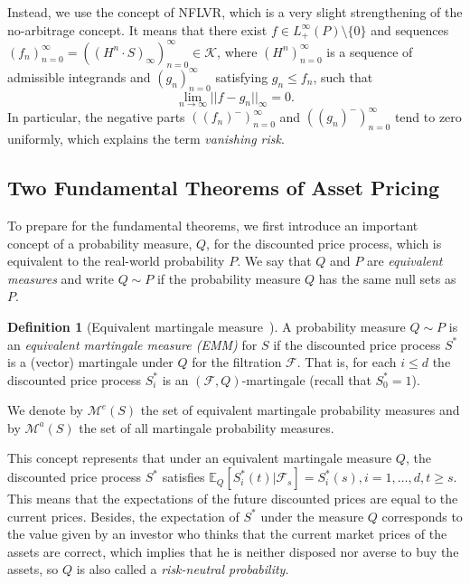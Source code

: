 \documentclass[a4paper]{article}
\theoremstyle{definition}
\newtheorem{definition}[theorem]{Definition}
\numberwithin{equation}{section}
\begin{document}
Instead, we use the concept of NFLVR, which is a very slight strengthening of the no-arbitrage concept. It means that there exist $f\in L^\infty_+(P)\setminus\{0\}$ and sequences $(f_n)^\infty_{n=0}=((H^n\cdot S)_\infty)^\infty_{n=0}\in\mathcal K$, where $(H^n)^\infty_{n=0}$ is a sequence of admissible integrands and $(g_n)^\infty_{n=0}$ satisfying $g_n\leq f_n$, such that
$$\lim_{n\rightarrow\infty}||f-g_n||_\infty=0.$$
In particular, the negative parts $((f_n)^-)^\infty_{n=0}$ and $((g_n)^-)^\infty_{n=0}$ tend to zero uniformly, which explains the term \emph{vanishing risk}.

\subsection{Two Fundamental Theorems of Asset Pricing}
To prepare for the fundamental theorems, we first introduce an important concept of a probability measure, $Q$, for the discounted price process, which is equivalent to the real-world probability $P$. We say that $Q$ and $P$ are \emph{equivalent measures} and write $Q\sim P$ if the probability measure $Q$ has the same null sets as $P$.
\begin{definition}[Equivalent martingale measure~\cite{book4}]
A probability measure $Q\sim P$ is an \emph{equivalent martingale measure (EMM)} for $S$ if the discounted price process $S^*$ is a (vector) martingale under $Q$ for the filtration $\mathcal F$. That is, for each $i\leq d$ the discounted price process $S^*_i$ is an $(\mathcal F,Q)$-martingale (recall that $S^*_0=1$).
\end{definition}
We denote by $\mathcal M^e(S)$ the set of equivalent martingale probability measures and by $\mathcal M^a(S)$ the set of all martingale probability measures.

This concept represents that under an equivalent martingale measure $Q$, the discounted price process $S^*$ satisfies $\mathbb E_Q[S^*_i(t)|\mathcal F_s]=S^*_i(s), i=1,\dots,d, t\geq s$. This means that the expectations of the future discounted prices are equal to the current prices. Besides, the expectation of $S^*$ under the measure $Q$ corresponds to the value given by an investor who thinks that the current market prices of the assets are correct, which implies that he is neither disposed nor averse to buy the assets, so $Q$ is also called a \emph{risk-neutral probability}.
\end{document}

